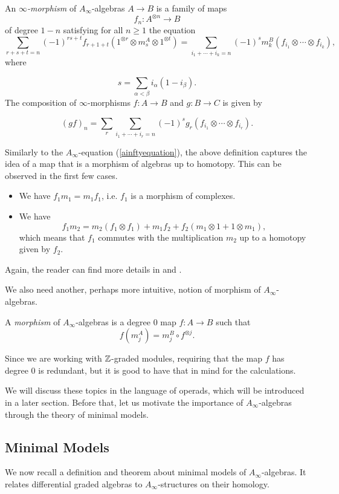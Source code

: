 \documentclass[Thesis.tex]{subfiles}
\begin{document}
\begin{defin}\label{inftymorphism}
An \emph{$\infty$-morphism} of $A_\infty$-algebras $A\to B$ is a family of maps \[f_n:A^{\otimes n}\to B\] of degree $1-n$ satisfying for all $n\geq 1$ the equation
\[\sum_{r+s+t=n} (-1)^{rs+t}f_{r+1+t}(1^{\otimes r} \otimes m^A_s\otimes 1^{\otimes t})=\sum_{i_1+\cdots+i_k=n} (-1)^s m^B_k(f_{i_1}\otimes\cdots\otimes f_{i_k}),\]
where

\[s=\sum_{\alpha<\beta}i_\alpha(1-i_\beta).\]
The composition of $\infty$-morphisms $f:A\to B$ and  $g:B\to C$ is given by 

\[(gf)_n=\sum_r\sum_{i_1+\cdots+i_r=n}(-1)^s g_r(f_{i_1}\otimes\cdots
\otimes f_{i_r}).\]
\end{defin}

Similarly to the $A_\infty$-equation (\ref{ainftyequation}), the above definition captures the idea of a map that is a morphism of algebras up to homotopy. This can be observed in the first few cases.

\begin{itemize}
\item We have $f_1m_1 = m_1f_1$, i.e. $f_1$ is a morphism of complexes.
\item We have
\[
f_1m_2 = m_2 (f_1\otimes f_1) + m_1f_2 + f_2 (m_1\otimes 1 + 1\otimes m_1),\]
which means that $f_1$ commutes with the multiplication $m_2$ up to a homotopy
given by $f_2$.
\end{itemize}

Again, the reader can find more details in \cite{keller} and \cite[\S 9.2]{lodayvallette}.

We also need another, perhaps more intuitive, notion of morphism of $A_\infty$-algebras.

\begin{defin}\label{inftyalgebramorphism}
A \emph{morphism} of $A_\infty$-algebras is a degree 0 map $f:A\to B$ such that
\[f(m^A_j)=m^B_j\circ f^{\otimes j}.\]
\end{defin}

Since we are working with $\mathbb{Z}$-graded modules, requiring that the map $f$ has degree 0 is redundant, but it is good to have that in mind for the calculations.

We will discuss these topics in the language of operads, which will be introduced in a later section. Before that, let us motivate the importance of $A_\infty$-algebras through the theory of minimal models.

\subsection{Minimal Models}\label{minimalmodels}
We now recall a definition and theorem about minimal models of $A_\infty$-algebras. It relates differential graded algebras to $A_\infty$-structures on their homology.
\end{document}
